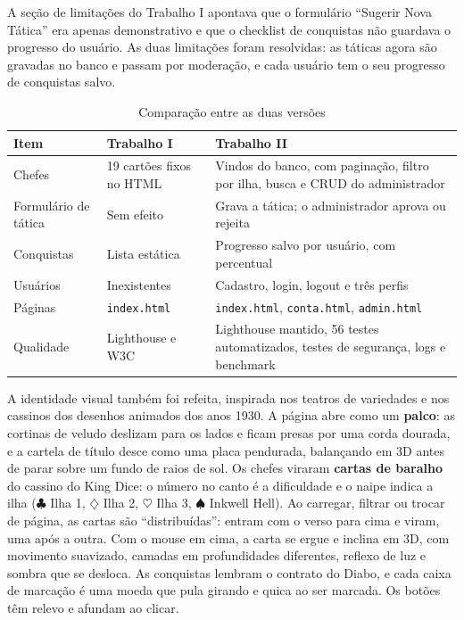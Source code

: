 \documentclass[12pt,a4paper]{article}
\newcommand{\cod}[1]{\texttt{#1}}
\begin{document}
A seção de limitações do Trabalho I apontava que o formulário ``Sugerir Nova
Tática'' era apenas demonstrativo e que o checklist de conquistas não guardava o
progresso do usuário. As duas limitações foram resolvidas: as táticas agora são
gravadas no banco e passam por moderação, e cada usuário tem o seu progresso de
conquistas salvo.

\begin{table}[H]
\centering
\begin{tabular}{|p{3cm}|p{5cm}|p{5.6cm}|}
\hline
\textbf{Item} & \textbf{Trabalho I} & \textbf{Trabalho II} \\ \hline
Chefes & 19 cartões fixos no HTML & Vindos do banco, com paginação, filtro por ilha, busca e CRUD do administrador \\ \hline
Formulário de tática & Sem efeito & Grava a tática; o administrador aprova ou rejeita \\ \hline
Conquistas & Lista estática & Progresso salvo por usuário, com percentual \\ \hline
Usuários & Inexistentes & Cadastro, login, logout e três perfis \\ \hline
Páginas & \cod{index.html} & \cod{index.html}, \cod{conta.html}, \cod{admin.html} \\ \hline
Qualidade & Lighthouse e W3C & Lighthouse mantido, 56 testes automatizados, testes de segurança, logs e benchmark \\ \hline
\end{tabular}
\caption{Comparação entre as duas versões}
\end{table}

A identidade visual também foi refeita, inspirada nos teatros de variedades e
nos cassinos dos desenhos animados dos anos 1930. A página abre como um
\textbf{palco}: as cortinas de veludo deslizam para os lados e ficam presas por
uma corda dourada, e a cartela de título desce como uma placa pendurada,
balançando em 3D antes de parar sobre um fundo de raios de sol. Os chefes
viraram \textbf{cartas de baralho} do cassino do King Dice: o número no canto é
a dificuldade e o naipe indica a ilha ($\clubsuit$ Ilha 1, $\diamondsuit$ Ilha 2,
$\heartsuit$ Ilha 3, $\spadesuit$ Inkwell Hell). Ao carregar, filtrar ou trocar
de página, as cartas são ``distribuídas'': entram com o verso para cima e viram,
uma após a outra. Com o mouse em cima, a carta se ergue e inclina em 3D, com
movimento suavizado, camadas em profundidades diferentes, reflexo de luz e
sombra que se desloca. As conquistas lembram o contrato do Diabo, e cada caixa
de marcação é uma moeda que pula girando e quica ao ser marcada. Os botões têm
relevo e afundam ao clicar.
\end{document}
